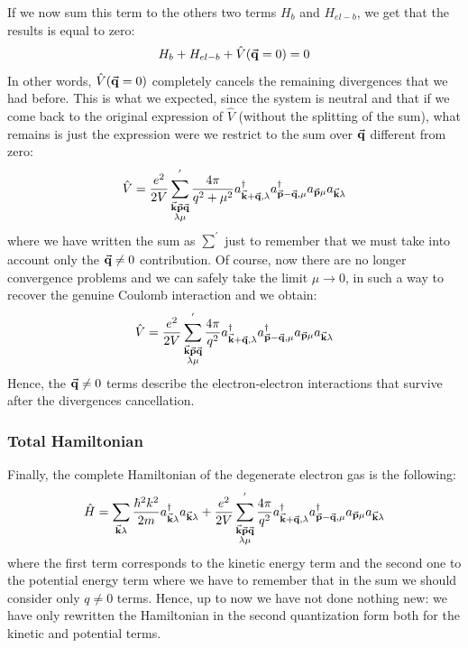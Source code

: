 \documentclass[../main/main.tex]{subfiles}
\begin{document}
If we now sum this term to the others two terms \( H_b \) and \( H_{el-b} \), we get that the results is equal to zero:
\begin{equation*}
  H_b + H_{el-b} + \hat{V}  (\va{q}=0) = 0
\end{equation*}
In other words, \( \hat{V}  (\va{q}=0) \)  completely cancels the remaining   divergences that we had before. This is what we expected, since the system is neutral and that if we come back to the original expression of \( \hat{V}  \) (without the splitting of the sum), what remains is just the expression were we restrict to the sum over \( \va{q} \) different from zero:
\begin{equation*}
  \hat{V} =  \frac{e^2}{2V} \sum_{\substack{\va{k}\va{p}\va{q} \\ \lambda \mu } }^{'} \frac{4 \pi }{q^2+\mu ^2} a_{\va{k}+ \va{q}, \lambda } ^\dag
  a_{\va{p}-\va{q}, \mu } ^\dag a_{\va{p}\mu }a_{\va{k} \lambda }
\end{equation*}
where we have written the sum as \( \sum_{}^{'}   \) just to remember that we must take into account only the \( \va{q} \neq 0 \) contribution.
Of course, now there are no longer convergence problems and we can safely take the limit \( \mu \rightarrow 0 \), in such a way to recover the genuine Coulomb interaction and we obtain:
\begin{equation*}
  \hat{V} = \frac{e^2}{2V}\sum_{\substack{\va{k}\va{p}\va{q} \\ \lambda \mu } }^{'}
  \frac{4 \pi }{q^2} a_{\va{k}+ \va{q}, \lambda } ^\dag
  a_{\va{p}-\va{q}, \mu } ^\dag a_{\va{p}\mu }a_{\va{k} \lambda }
\end{equation*}
Hence, the \( \va{q}\neq 0 \) terms describe the electron-electron interactions that survive after the divergences cancellation. 


\subsubsection{Total Hamiltonian}
Finally, the complete Hamiltonian of the degenerate electron gas is the following: 
\begin{equation}
  \hat{H} = \sum_{\va{k} \lambda }^{} \frac{\hbar ^2 k^2}{2m} a_{\va{k}\lambda }^\dag a_{\va{k}\lambda } + \frac{e^2}{2V} \sum_{\substack{\va{k}\va{p}\va{q} \\ \lambda \mu  } }^{'} \frac{4 \pi }{q^2} a_{\va{k}+\va{q}, \lambda } ^\dag  a_{\va{p}-\va{q}, \mu } ^\dag a_{\va{p}\mu }a_{\va{k} \lambda }
\end{equation}
where the first term corresponds to the kinetic energy term and the second one to the  potential energy term  where we have to remember that in the sum we should consider only \( q \neq 0 \) terms.
Hence, up to now we have not done nothing new: we have only rewritten the Hamiltonian in the second quantization form both for the kinetic and potential terms.
\end{document}

